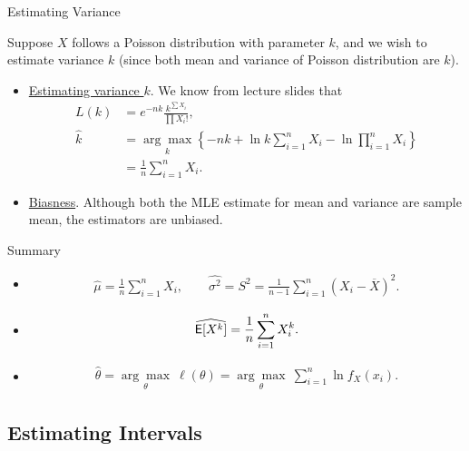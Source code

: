 \begin{frame}{Estimating Variance}

\justifying
{} Suppose $X$ follows a Poisson distribution with parameter $k$, and we wish to estimate variance $k$ (since both mean and variance of Poisson distribution are $k$).
\begin{itemize}
	\justifying
	\item \underline{Estimating variance $k$}. We know from lecture slides that
	\footnotesize
	\begin{align*}
	L(k) & = e^{-nk} \frac{k^{\sum X_i}}{\prod X_i!}, \\
	\widehat{k} & = \underset{k}{\arg\max}\left\{-nk + \ln k\sum_{i=1}^n X_i - \ln\prod_{i=1}^n X_i \right\} \\
	& = \frac{1}{n}\sum_{i=1}^n X_i.
	\end{align*}
	\normalsize
	\item \underline{Biasness}. Although both the MLE estimate for mean and variance are sample mean, the estimators are unbiased.
\end{itemize}

\end{frame}

\begin{frame}{Summary}

\begin{itemize}
	\justifying
	\item {} 
	\begin{align*}
	\widehat{\mu} = \frac{1}{n}\sum_{i=1}^n X_i, \qquad \widehat{\sigma^2} = S^2 = \frac{1}{n-1}\sum_{i=1}^n (X_i - \overline{X})^2.
	\end{align*}
	\item {}
	\begin{align*}
	\widehat{\mathsf{E}[X^k]} = \frac{1}{n}\sum_{i=1}^n X_i^k.
	\end{align*}
	\item {}
	\begin{align*}
	\widehat{\theta} = \underset{\theta}{\arg\max}\ \ell(\theta) = \underset{\theta}{\arg\max}\ \sum_{i=1}^n \ln f_{X}(x_i).
	\end{align*}
\end{itemize}


\end{frame}


\subsection{Estimating Intervals}

